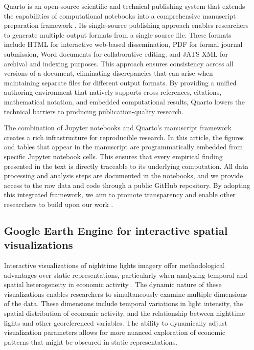 \documentclass[
  a4paper, 
  twoside,
  review
]{article}
\newcounter{code}
\begin{document}
Quarto is an open-source scientific and technical publishing system that
extends the capabilities of computational notebooks into a comprehensive
manuscript preparation framework \citep{allaire_quarto}. Its
single-source publishing approach enables researchers to generate
multiple output formats from a single source file. These formats include
HTML for interactive web-based dissemination, PDF for formal journal
submission, Word documents for collaborative editing, and JATS XML for
archival and indexing purposes. This approach ensures consistency across
all versions of a document, eliminating discrepancies that can arise
when maintaining separate files for different output formats. By
providing a unified authoring environment that natively supports
cross-references, citations, mathematical notation, and embedded
computational results, Quarto lowers the technical barriers to producing
publication-quality research.

The combination of Jupyter notebooks and Quarto's manuscript framework
creates a rich infrastructure for reproducible research. In this
article, the figures and tables that appear in the manuscript are
programmatically embedded from specific Jupyter notebook cells. This
ensures that every empirical finding presented in the text is directly
traceable to its underlying computation. All data processing and
analysis steps are documented in the notebooks, and we provide access to
the raw data and code through a public GitHub repository. By adopting
this integrated framework, we aim to promote transparency and enable
other researchers to build upon our work \citep{peng_reproducible}.

\subsection{Google Earth Engine for interactive spatial
visualizations}\label{google-earth-engine-for-interactive-spatial-visualizations}

Interactive visualizations of nighttime lights imagery offer
methodological advantages over static representations, particularly when
analyzing temporal and spatial heterogeneity in economic activity
\citep{donaldson_storeygard_remotesensing}. The dynamic nature of these
visualizations enables researchers to simultaneously examine multiple
dimensions of the data. These dimensions include temporal variations in
light intensity, the spatial distribution of economic activity, and the
relationship between nighttime lights and other georeferenced variables.
The ability to dynamically adjust visualization parameters allows for
more nuanced exploration of economic patterns that might be obscured in
static representations.
\end{document}
